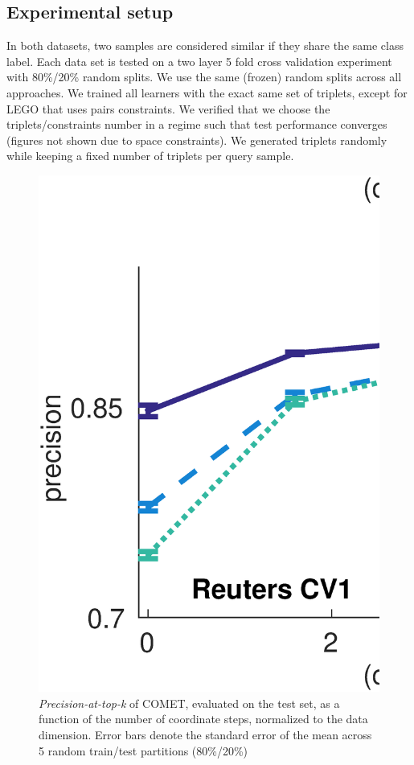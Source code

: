 \documentclass{article}
\begin{document}
\subsection{Experimental setup}
In both datasets, two samples are considered similar if they share the same class label. Each data set is tested on a two layer 5 fold cross validation experiment with 80\%/20\% random splits. We use the same (frozen) random splits across all approaches. We trained all learners with the exact same set of triplets, except for LEGO that uses pairs constraints. We verified that we choose the triplets/constraints number in a regime such that test performance converges (figures not shown due to space constraints). We generated triplets randomly while keeping a fixed number of triplets per query sample.

\begin{figure}[!ht]
\vskip 0.2in
\begin{center}
\centerline{\includegraphics[width=\columnwidth]{COMET_convergence}}
\caption{ \textit{Precision-at-top-k} of COMET, evaluated on the test set, as a function of the number of coordinate steps, normalized to the data dimension. Error bars denote the standard error of the mean across 5 random train/test partitions (80\%/20\%) }
\label{cometConvergeFig}
\end{center}
\vskip -0.2in
\end{figure} 
\end{document}
